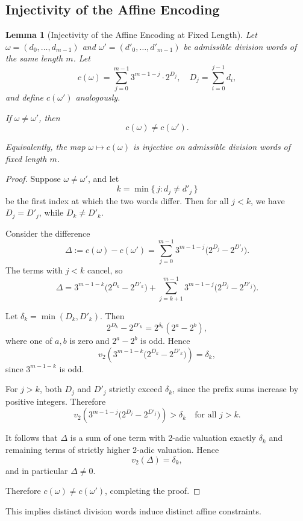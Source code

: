 \documentclass[12pt, oneside]{article}
\numberwithin{equation}{section}
\theoremstyle{definition}
\theoremstyle{plain}
\newtheorem{lemma}[theorem]{Lemma}
\theoremstyle{remark}
\begin{document}
\subsection{Injectivity of the Affine Encoding}
\begin{lemma}[Injectivity of the Affine Encoding at Fixed Length]
\label{lem:injectivity}
Let $\omega = (d_0,\dots,d_{m-1})$ and $\omega' = (d'_0,\dots,d'_{m-1})$
be admissible division words of the same length $m$. Let
\[
c(\omega)
=
\sum_{j=0}^{m-1}
3^{m-1-j}\cdot 2^{D_j},
\quad
D_j = \sum_{i=0}^{j-1} d_i,
\]
and define $c(\omega')$ analogously.

If $\omega \ne \omega'$, then
\[
c(\omega) \ne c(\omega').
\]

Equivalently, the map $\omega \mapsto c(\omega)$ is injective on admissible
division words of fixed length $m$.
\end{lemma}

\begin{proof}
Suppose $\omega \ne \omega'$, and let
\[
k = \min\{\, j : d_j \ne d'_j \,\}
\]
be the first index at which the two words differ. Then for all $j < k$,
we have $D_j = D'_j$, while $D_k \ne D'_k$.

Consider the difference
\[
\Delta := c(\omega) - c(\omega')
=
\sum_{j=0}^{m-1}
3^{m-1-j}\bigl(2^{D_j} - 2^{D'_j}\bigr).
\]
The terms with $j<k$ cancel, so
\[
\Delta
=
3^{m-1-k}\bigl(2^{D_k} - 2^{D'_k}\bigr)
+
\sum_{j=k+1}^{m-1}
3^{m-1-j}\bigl(2^{D_j} - 2^{D'_j}\bigr).
\]

Let $\delta_k = \min(D_k, D'_k)$. Then
\[
2^{D_k} - 2^{D'_k}
=
2^{\delta_k}(2^a - 2^b),
\]
where one of $a,b$ is zero and $2^a - 2^b$ is odd. Hence
\[
v_2\!\left(3^{m-1-k}\bigl(2^{D_k} - 2^{D'_k}\bigr)\right)
=
\delta_k,
\]
since $3^{m-1-k}$ is odd.

For $j>k$, both $D_j$ and $D'_j$ strictly exceed $\delta_k$, since the
prefix sums increase by positive integers. Therefore
\[
v_2\!\left(3^{m-1-j}\bigl(2^{D_j} - 2^{D'_j}\bigr)\right)
>
\delta_k
\quad \text{for all } j>k.
\]

It follows that $\Delta$ is a sum of one term with 2-adic valuation
exactly $\delta_k$ and remaining terms of strictly higher 2-adic
valuation. Hence
\[
v_2(\Delta) = \delta_k,
\]
and in particular $\Delta \ne 0$.

Therefore $c(\omega) \ne c(\omega')$, completing the proof.
\end{proof}

This implies distinct division words induce distinct affine constraints.
\end{document}
